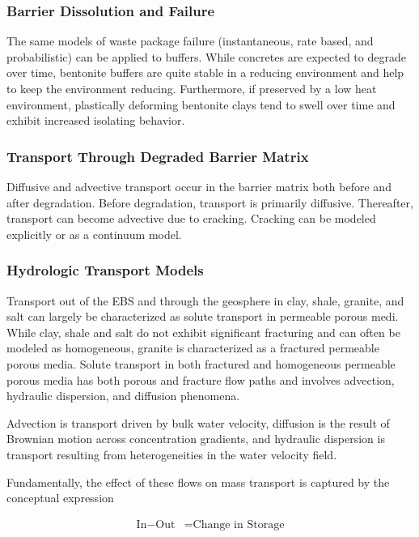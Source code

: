 \subsubsection{Barrier Dissolution and Failure}

The same models of waste package failure (instantaneous, rate based, and 
probabilistic) can be applied to buffers. While concretes are expected to 
degrade over time, bentonite buffers are quite stable in a reducing 
environment and help to keep the environment reducing. Furthermore, if 
preserved by a low heat environment, plastically deforming bentonite
clays tend to swell over time and exhibit increased isolating behavior.

\subsubsection{Transport Through Degraded Barrier Matrix}

Diffusive and advective transport occur in the barrier matrix both before and 
after degradation. Before degradation, transport is primarily diffusive. 
Thereafter, transport can become advective due to cracking. Cracking can be 
modeled explicitly or as a continuum model.  


\subsubsection{Hydrologic Transport Models}

Transport out of the \gls{EBS} and through the geosphere in clay, shale, granite,
and salt can largely be characterized as solute transport in permeable porous 
medi. While clay, shale and salt do not exhibit significant fracturing and can 
often be modeled as homogeneous, granite is  characterized as a fractured 
permeable porous media.  Solute transport in both fractured and homogeneous 
permeable porous media has both porous and fracture flow paths and involves
advection, hydraulic dispersion, and diffusion phenomena. 

Advection is transport driven by bulk water velocity, diffusion is the 
result of Brownian motion across concentration gradients, and hydraulic 
dispersion is transport resulting from heterogeneities in the water velocity field. 

Fundamentally, the effect of these flows on mass transport is captured by the 
conceptual expression 

\begin{align}
  \mbox{In} - \mbox{Out} &= \mbox{Change in Storage}
  \label{inout}
\end{align} 

